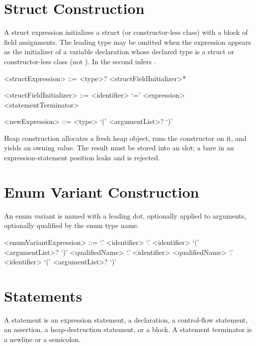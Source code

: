 \documentclass[makeidx]{article}
\begin{document}
\section{Struct Construction}

\LMHash{}%
A struct expression initializes a struct (or constructor-less class)
with a  block of field assignments.
The leading type may be omitted when the expression appears as the
initializer of a variable declaration whose declared type is a struct
or constructor-less class (not ). In
 the second  infers
.

\begin{grammar}
<structExpression> ::= <type>? \HAS{} <structFieldInitializer>* \END{}

<structFieldInitializer> ::= <identifier> `=' <expression> <statementTerminator>

<newExpression> ::= \NEW{} <type> `(' <argumentList>? `)'
\end{grammar}

\LMHash{}%
Heap construction  allocates a fresh heap object,
runs the constructor on it, and yields an owning value.
The result must be stored into an  slot; a bare
 in an expression-statement position leaks and is rejected.

\section{Enum Variant Construction}

\LMHash{}%
An enum variant is named with a leading dot, optionally applied to
arguments, optionally qualified by the enum type name.

\begin{grammar}
<enumVariantExpression> ::= `.' <identifier>
  \alt `.' <identifier> `(' <argumentList>? `)'
  \alt <qualifiedName> `.' <identifier>
  \alt <qualifiedName> `.' <identifier> `(' <argumentList>? `)'
\end{grammar}

\section{Statements}

\LMHash{}%
A statement is an expression statement, a declaration, a control-flow
statement, an assertion, a heap-destruction statement, or a block.
A statement terminator is a newline or a semicolon.
\end{document}
